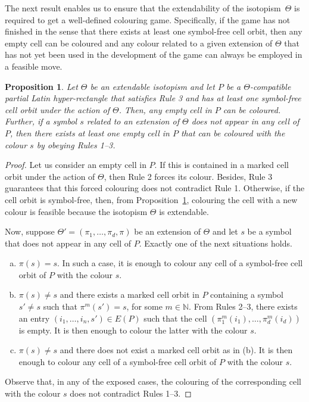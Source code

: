 \documentclass{article}
\newtheorem{prop}[thm]{Proposition}
\begin{document}
The next result enables us to ensure that the extendability of the isotopism~$\Theta$ is required to get a well-defined colouring game. Specifically, if the game has not finished in the sense that there exists at least 
one symbol-free cell orbit, then any empty cell can be coloured and any colour related to a given extension of $\Theta$ that has not yet been used in the development of the game can always be employed in a feasible move.

\begin{prop}\label{extensionsareuseful} Let $\Theta$ be an extendable isotopism and let $P$ be a $\Theta$-compatible partial Latin hyper-rectangle that satisfies Rule 3 and has at 
least one 
symbol-free cell orbit under the action of $\Theta$. Then, any empty cell in $P$ can be coloured. Further, if a symbol $s$ related to an extension of $\Theta$ does not appear in any cell of $P$, then there exists at least one empty cell in $P$ that can be coloured with the colour $s$ by obeying Rules 1--3.
\end{prop}

\begin{proof} Let us consider an empty cell in $P$. If this is contained in a marked cell orbit under the action of $\Theta$, then Rule 2 forces its colour. Besides, Rule 3 guarantees that this forced colouring does not contradict Rule 1. Otherwise, if the cell orbit is symbol-free, then, from Proposition~\ref{extensionsareuseful}, colouring the cell with a new colour is feasible because the isotopism $\Theta$ is extendable.

Now, suppose $\Theta'=(\pi_1,\ldots,\pi_d,\pi)$ be an extension of $\Theta$ and let $s$ be a symbol that does not appear in any cell of $P$. Exactly one of the next situations holds.
\begin{enumerate}[a)]
\item $\pi(s)=s$. In such a case, it is enough to colour any cell of a symbol-free cell orbit of $P$ with the colour $s$.
\item $\pi(s)\neq s$ and there exists a marked cell orbit in $P$ containing a symbol $s'\neq s$ such that $\pi^m(s')=s$, for some $m\in\mathbb{N}$. From Rules 2--3, there exists an entry $(i_1,\ldots,i_n,s')\in E(P)$ such that the cell $(\pi^m_1(i_1),\ldots,\pi^m_d(i_d))$ is empty. It is then enough to colour the latter with the colour $s$.
\item $\pi(s)\neq s$ and there does not exist a marked cell orbit as in (b). It is then enough to colour any cell of a symbol-free cell orbit of $P$ with the colour $s$.
\end{enumerate}

Observe that, in any of the exposed cases, the colouring of the corresponding cell with the colour $s$ does not contradict Rules 1--3.
\end{proof}
\end{document}
